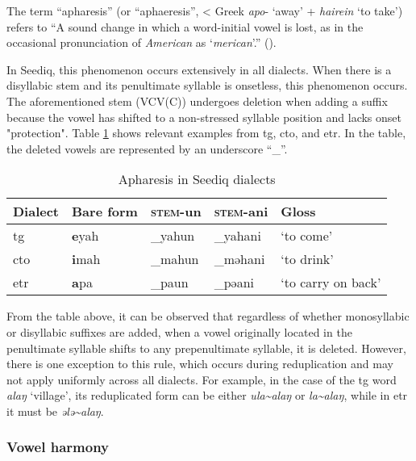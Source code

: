 The term ``apharesis'' (or ``aphaeresis'', < Greek \textit{apo}- `away' + \textit{hairein} `to take') refers to ``A sound change in which a word-initial vowel is lost, as in the occasional pronunciation of \textit{American} as `\textit{merican}'.'' (\cite[13]{campbell2007HLglossary}).

In Seediq, this phenomenon occurs extensively in all dialects. When there is a disyllabic stem and its penultimate syllable is onsetless, this phenomenon occurs. The aforementioned stem (VCV(C)) undergoes deletion when adding a suffix because the vowel has shifted to a non-stressed syllable position and lacks onset "protection". Table \ref{tab:apharesis} shows relevant examples from \acl{tg}, \acl{cto}, and \acl{etr}. In the table, the deleted vowels are represented by an underscore ``\_''.

\begin{table}[!htbp]
\centering
\caption{Apharesis in Seediq dialects}
\label{tab:apharesis}
\begin{tabular}{lllll}
\hline
Dialect   & Bare form & \textsc{stem}-un & \textsc{stem}-ani & Gloss              \\ \hline
\acl{tg}  & \textbf{e}yah      & \_yahun          & \_yahani          & `to come'          \\
\acl{cto} & \textbf{i}mah      & \_mahun          & \_məhani          & `to drink'         \\
\acl{etr} & \textbf{a}pa       & \_paun           & \_pəani           & `to carry on back' \\ \hline
\end{tabular}
\end{table}

From the table above, it can be observed that regardless of whether monosyllabic or disyllabic suffixes are added, when a vowel originally located in the penultimate syllable shifts to any prepenultimate syllable, it is deleted. However, there is one exception to this rule, which occurs during reduplication and may not apply uniformly across all dialects. For example, in the case of the \acl{tg} word \textit{alaŋ} `village', its reduplicated form can be either \textit{ula\~{}alaŋ} or \textit{la\~{}alaŋ}, while in \acl{etr} it must be \textit{ələ\~{}alaŋ}.


\subsubsection{Vowel harmony} \label{sec:vhar}

